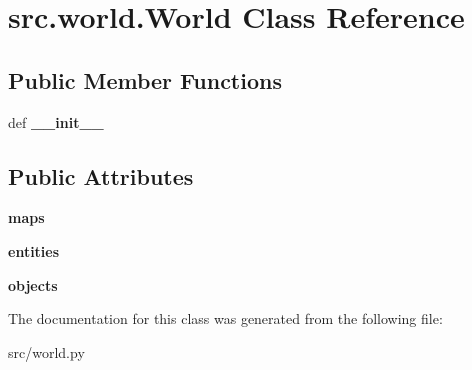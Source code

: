 \hypertarget{classsrc_1_1world_1_1_world}{\section{src.\-world.\-World \-Class \-Reference}
\label{classsrc_1_1world_1_1_world}
}
\subsection*{\-Public \-Member \-Functions}
\begin{DoxyCompactItemize}
\item 
\hypertarget{classsrc_1_1world_1_1_world_a6dea64e86406f597719dc713269c576f}{def {\bfseries \-\_\-\-\_\-init\-\_\-\-\_\-}}\label{classsrc_1_1world_1_1_world_a6dea64e86406f597719dc713269c576f}

\end{DoxyCompactItemize}
\subsection*{\-Public \-Attributes}
\begin{DoxyCompactItemize}
\item 
\hypertarget{classsrc_1_1world_1_1_world_a3d59efedb025f0fe4474071e99ff1548}{{\bfseries maps}}\label{classsrc_1_1world_1_1_world_a3d59efedb025f0fe4474071e99ff1548}

\item 
\hypertarget{classsrc_1_1world_1_1_world_a08fc5ac30d6e377914055a1688aa141f}{{\bfseries entities}}\label{classsrc_1_1world_1_1_world_a08fc5ac30d6e377914055a1688aa141f}

\item 
\hypertarget{classsrc_1_1world_1_1_world_a122d24d465ff30df9b2329d8e1e131f7}{{\bfseries objects}}\label{classsrc_1_1world_1_1_world_a122d24d465ff30df9b2329d8e1e131f7}

\end{DoxyCompactItemize}


\-The documentation for this class was generated from the following file\-:\begin{DoxyCompactItemize}
\item 
src/world.\-py\end{DoxyCompactItemize}
